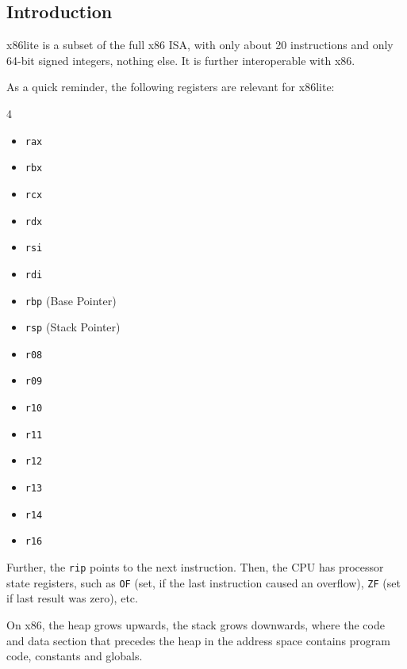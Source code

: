 \subsection{Introduction}
x86lite is a subset of the full x86 ISA, with only about 20 instructions and only 64-bit signed integers, nothing else.
It is further interoperable with x86.

As a quick reminder, the following registers are relevant for x86lite:
\begin{multicols}{4}
    \begin{itemize}
        \item \texttt{rax}
        \item \texttt{rbx}
        \item \texttt{rcx}
        \item \texttt{rdx}
        \item \texttt{rsi}
        \item \texttt{rdi}
        \item \texttt{rbp} (Base Pointer)
        \item \texttt{rsp} (Stack Pointer)
        \item \texttt{r08}
        \item \texttt{r09}
        \item \texttt{r10}
        \item \texttt{r11}
        \item \texttt{r12}
        \item \texttt{r13}
        \item \texttt{r14}
        \item \texttt{r16}
    \end{itemize}
\end{multicols}

Further, the \texttt{rip} points to the next instruction. Then, the CPU has processor state registers, such as \texttt{OF} (set, if the last instruction caused an overflow),
\texttt{ZF} (set if last result was zero), etc.

On x86, the heap grows upwards, the stack grows downwards, where the code and data section that precedes the heap in the address space contains program code, constants and globals.
